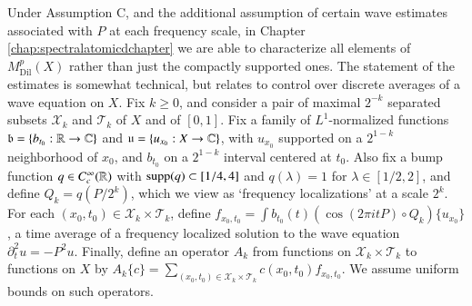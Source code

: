 Under Assumption C, and the additional assumption of certain wave estimates associated with $P$ at each frequency scale, in Chapter \ref{chap:spectralatomicdchapter} we are able to characterize all elements of $M^p_{\text{Dil}}(X)$ rather than just the compactly supported ones. The statement of the estimates is somewhat technical, but relates to control over discrete averages of a wave equation on $X$. Fix $k \geq 0$, and consider a pair of maximal $2^{-k}$ separated subsets $\mathcal{X}_k$ and $\mathcal{T}_k$ of $X$ and of $[0,1]$. Fix a family of $L^1$-normalized functions $\mathfrak{b} = \{ b_{t_0}: \operatorname{\mathbb{R}} \to \operatorname{\mathbb{C}} \}$ and $\mathfrak{u} = \{ u_{x_0}: X \to \operatorname{\mathbb{C}} \}$, with $u_{x_0}$ supported on a $2^{1-k}$ neighborhood of $x_0$, and $b_{t_0}$ on a $2^{1-k}$ interval centered at $t_0$. Also fix a bump function $q \in C_c^\infty(\operatorname{\mathbb{R}})$ with $\operatorname{\text{supp}}(q) \subset [1/4,4]$ and $q(\lambda) = 1$ for $\lambda \in [1/2,2]$, and define $Q_k = q(P/2^k)$, which we view as `frequency localizations' at a scale $2^k$. For each $(x_0,t_0) \in \mathcal{X}_k \times \mathcal{T}_k$, define $f_{x_0,t_0} = \int b_{t_0}(t) (\cos(2 \pi i t P) \circ Q_k) \{ u_{x_0} \}$, a time average of a frequency localized solution to the wave equation $\partial_t^2 u = - P^2 u$. Finally, define an operator $A_k$ from functions on $\mathcal{X}_k \times \mathcal{T}_k$ to functions on $X$ by $A_k \{ c \} = \sum\nolimits_{(x_0,t_0) \in \mathcal{X}_k \times \mathcal{T}_k} c(x_0,t_0) f_{x_0,t_0}$. We assume uniform bounds on such operators.

\vspace{0.5em}

\noindent {}

